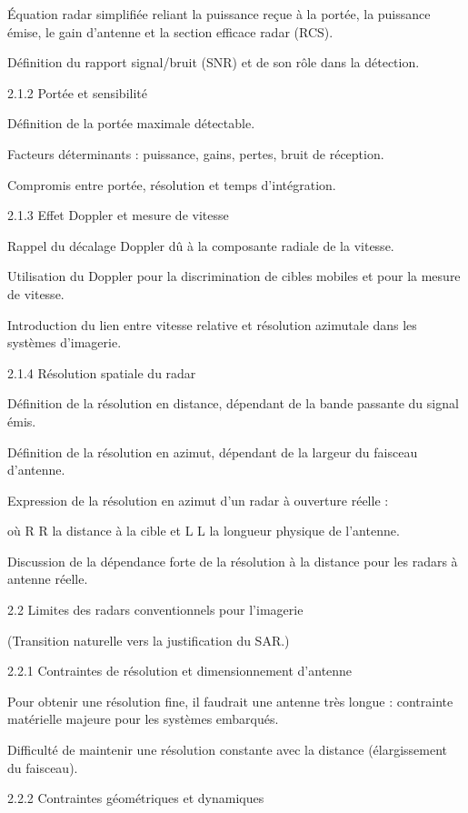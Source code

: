 Équation radar simplifiée reliant la puissance reçue à la portée, la puissance émise, le gain d’antenne et la section efficace radar (RCS).

Définition du rapport signal/bruit (SNR) et de son rôle dans la détection.

2.1.2 Portée et sensibilité

Définition de la portée maximale détectable.

Facteurs déterminants : puissance, gains, pertes, bruit de réception.

Compromis entre portée, résolution et temps d’intégration.

2.1.3 Effet Doppler et mesure de vitesse

Rappel du décalage Doppler dû à la composante radiale de la vitesse.

Utilisation du Doppler pour la discrimination de cibles mobiles et pour la mesure de vitesse.

Introduction du lien entre vitesse relative et résolution azimutale dans les systèmes d’imagerie.

2.1.4 Résolution spatiale du radar

Définition de la résolution en distance, dépendant de la bande passante du signal émis.

Définition de la résolution en azimut, dépendant de la largeur du faisceau d’antenne.

Expression de la résolution en azimut d’un radar à ouverture réelle :




où 
R
R la distance à la cible et 
L
L la longueur physique de l’antenne.

Discussion de la dépendance forte de la résolution à la distance pour les radars à antenne réelle.

2.2 Limites des radars conventionnels pour l’imagerie

(Transition naturelle vers la justification du SAR.)

2.2.1 Contraintes de résolution et dimensionnement d’antenne

Pour obtenir une résolution fine, il faudrait une antenne très longue : contrainte matérielle majeure pour les systèmes embarqués.

Difficulté de maintenir une résolution constante avec la distance (élargissement du faisceau).

2.2.2 Contraintes géométriques et dynamiques

